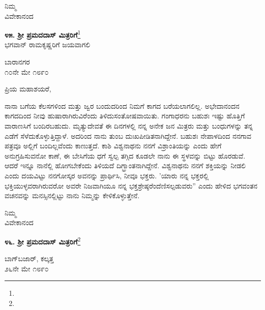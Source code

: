 \vspace{-0.3cm}

{\flushright
ನಿಮ್ಮ\\ವಿವೇಕಾನಂದ\par}

\begin{center}
\textbf{೪೫. ಶ‍್ರೀ ಪ್ರಮದದಾಸ್ ಮಿತ್ರರಿಗೆ}\footnote{}\\ ಭಗವಾನ್ ರಾಮಕೃಷ್ಣರಿಗೆ ಜಯವಾಗಲಿ
\end{center}

\vspace{-0.65cm}

\begin{flushright}
ಬಾರಾನಗರ\\೧೦ನೇ ಮೇ ೧೮೯೦
\end{flushright}

\noindent
ಪ್ರಿಯ ಮಹಾಶಯರೆ,

ನಾನಾ ಬಗೆಯ ಕೆಲಸಗಳಿಂದ ಮತ್ತು ಜ್ವರ ಬಂದುದರಿಂದ ನಿಮಗೆ ಕಾಗದ ಬರೆಯಲಾಗಲಿಲ್ಲ. ಅಭೇದಾನಂದನ ಕಾಗದದಿಂದ ನೀವು ಹುಷಾರಾಗಿರುವಿರೆಂದು ತಿಳಿದು\break ಸಂತೋಷವಾಯಿತು. ಗಂಗಾಧರನು ಬಹುಶಃ ಇಷ್ಟು ಹೊತ್ತಿಗೆ ವಾರಾಣಸಿಗೆ ಬಂದಿರಬಹುದು. ಮೃತ್ಯುದೇವತೆ ಈ ದಿನಗಳಲ್ಲಿ ನನ್ನ ಅನೇಕ ಜನ ಮಿತ್ರರು ಮತ್ತು ಬಂಧುಗಳನ್ನು ತನ್ನ ಎಡೆಗೆ ಸೆಳೆದುಕೊಳ್ಳುತ್ತಿದ್ದಾಳೆ. ಅದರಿಂದ ನಾನು ತುಂಬ ದುಃಖಪೀಡಿತನಾಗಿದ್ದೇನೆ. ಬಹುಶಃ ನೇಪಾಳದಿಂದ ನನಗಾವ ಪತ್ರವೂ ಅಲ್ಲಿಗೆ ಬಂದಿಲ್ಲವೆಂದು ಕಾಣುತ್ತದೆ. ಕಾಶಿ ವಿಶ್ವನಾಥನು ನನಗೆ ವಿಶ್ರಾಂತಿಯನ್ನು ಎಂದು ಹೇಗೆ ಅನುಗ್ರಹಿಸುವನೋ ಕಾಣೆ, ಈ ಬೇಸಿಗೆಯ ಧಗೆ ಸ್ವಲ್ಪ ತಗ್ಗಿದ ಕೂಡಲೇ ನಾನು ಈ ಸ್ಥಳವನ್ನು ಬಿಟ್ಟು ಹೊರಡುವೆ. ಆದರೆ ಇನ್ನೂ ನಾನೆಲ್ಲಿ ಹೋಗಬೇಕೆಂದು ತಿಳಿಯದೆ ದಿಗ್ಭ್ರಾಂತನಾಗಿದ್ದೇನೆ. ವಿಶ್ವನಾಥನು ನನಗೆ ಶಕ್ತಿಯನ್ನು ನೀಡಲಿ ಎಂದು ದಯವಿಟ್ಟು ನನಗೋಸ್ಕರ ಅವನನ್ನು ಪ್ರಾರ್ಥಿಸಿ, ನೀವೂ ಭಕ್ತರು. 'ಯಾರು ನನ್ನ ಭಕ್ತರಲ್ಲಿ ಭಕ್ತಿಯುಳ್ಳವರಾಗಿರುವರೋ ಅವರೇ ನಿಜವಾಗಿಯೂ ನನ್ನ ಭಕ್ತಶ್ರೇಷ್ಠರೆಂದೆಣಿಸಲ್ಪಡುವರು'' ಎಂದು ಹೇಳಿದ ಭಗವಂತನ ವಚನವನ್ನು ಮನಸ್ಸಿನಲ್ಲಿಟ್ಟು ನಾನು ನಿಮ್ಮನ್ನು ಕೇಳಿಕೊಳ್ಳುತ್ತೇನೆ.

\vspace{-0.5cm}

{\flushright
ನಿಮ್ಮ\\ವಿವೇಕಾನಂದ\par}

\begin{center}
\textbf{೪೬. ಶ‍್ರೀ ಪ್ರಮದದಾಸ್ ಮಿತ್ರರಿಗೆ}\footnote{}
\end{center}

\vspace{-0.5cm}

\begin{flushright}
ಬಾಗ್‌ಬಜಾರ್, ಕಲ್ಕತ್ತ\\೨೬ನೇ ಮೇ ೧೮೯೦
\end{flushright}

